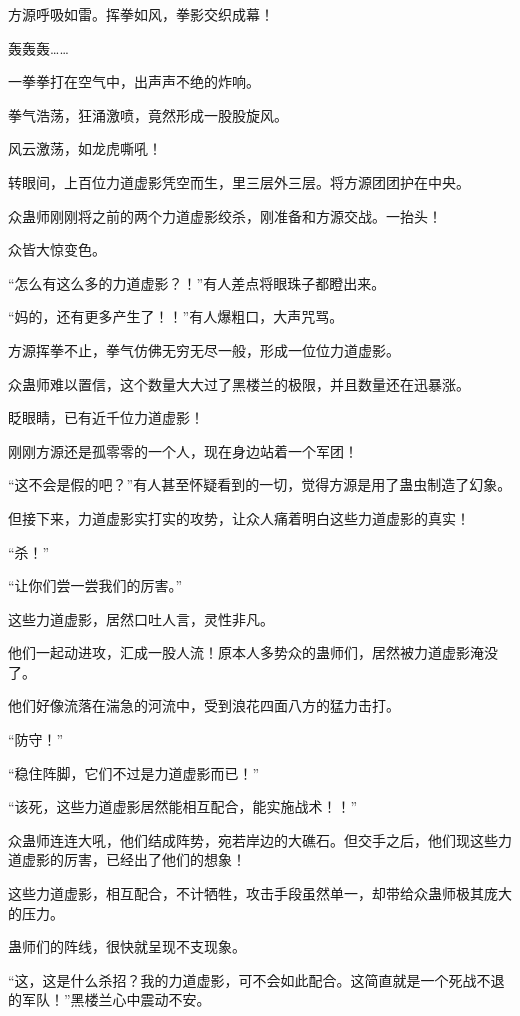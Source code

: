 \begin{this_body}
方源呼吸如雷。挥拳如风，拳影交织成幕！

轰轰轰……

一拳拳打在空气中，出声声不绝的炸响。

拳气浩荡，狂涌激喷，竟然形成一股股旋风。

风云激荡，如龙虎嘶吼！

转眼间，上百位力道虚影凭空而生，里三层外三层。将方源团团护在中央。

众蛊师刚刚将之前的两个力道虚影绞杀，刚准备和方源交战。一抬头！

众皆大惊变色。

“怎么有这么多的力道虚影？！”有人差点将眼珠子都瞪出来。

“妈的，还有更多产生了！！”有人爆粗口，大声咒骂。

方源挥拳不止，拳气仿佛无穷无尽一般，形成一位位力道虚影。

众蛊师难以置信，这个数量大大过了黑楼兰的极限，并且数量还在迅暴涨。

眨眼睛，已有近千位力道虚影！

刚刚方源还是孤零零的一个人，现在身边站着一个军团！

“这不会是假的吧？”有人甚至怀疑看到的一切，觉得方源是用了蛊虫制造了幻象。

但接下来，力道虚影实打实的攻势，让众人痛着明白这些力道虚影的真实！

“杀！”

“让你们尝一尝我们的厉害。”

这些力道虚影，居然口吐人言，灵性非凡。

他们一起动进攻，汇成一股人流！原本人多势众的蛊师们，居然被力道虚影淹没了。

他们好像流落在湍急的河流中，受到浪花四面八方的猛力击打。

“防守！”

“稳住阵脚，它们不过是力道虚影而已！”

“该死，这些力道虚影居然能相互配合，能实施战术！！”

众蛊师连连大吼，他们结成阵势，宛若岸边的大礁石。但交手之后，他们现这些力道虚影的厉害，已经出了他们的想象！

这些力道虚影，相互配合，不计牺牲，攻击手段虽然单一，却带给众蛊师极其庞大的压力。

蛊师们的阵线，很快就呈现不支现象。

“这，这是什么杀招？我的力道虚影，可不会如此配合。这简直就是一个死战不退的军队！”黑楼兰心中震动不安。


\end{this_body}
